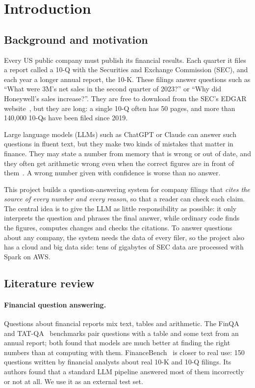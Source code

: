 \section{Introduction}

\subsection{Background and motivation}

Every US public company must publish its financial results. Each quarter it files a report called a
10-Q with the Securities and Exchange Commission (SEC), and each year a longer annual report, the
10-K. These filings answer questions such as ``What were 3M's net sales in the second quarter of
2023?'' or ``Why did Honeywell's sales increase?''. They are free to download from the SEC's EDGAR
website~\cite{sec-edgar}, but they are long: a single 10-Q often has 50 pages, and more than 140,000
10-Qs have been filed since 2019.

Large language models (LLMs) such as ChatGPT or Claude can answer such questions in fluent text, but
they make two kinds of mistakes that matter in finance. They may state a number from memory that is
wrong or out of date, and they often get arithmetic wrong even when the correct figures are in front
of them~\cite{financebench,finqa}. A wrong number given with confidence is worse than no answer.

This project builds a question-answering system for company filings that \emph{cites the source of
every number and every reason}, so that a reader can check each claim. The central idea is to give
the LLM as little responsibility as possible: it only interprets the question and phrases the final
answer, while ordinary code finds the figures, computes changes and checks the citations. To answer
questions about any company, the system needs the data of every filer, so the project also has a
cloud and big data side: tens of gigabytes of SEC data are processed with Spark on AWS.

\subsection{Literature review}

\paragraph{Financial question answering.} Questions about financial reports mix text, tables and
arithmetic. The FinQA~\cite{finqa} and TAT-QA~\cite{tatqa} benchmarks pair questions with a table and
some text from an annual report; both found that models are much better at finding the right numbers
than at computing with them. FinanceBench~\cite{financebench} is closer to real use: 150 questions
written by financial analysts about real 10-K and 10-Q filings. Its authors found that a standard
LLM pipeline answered most of them incorrectly or not at all. We use it as an external test set.

